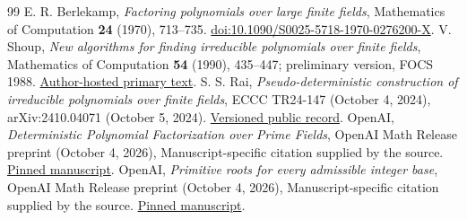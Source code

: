 \documentclass[11pt]{article}
\begin{document}
\begin{thebibliography}{99}
 E. R. Berlekamp, \emph{Factoring polynomials over large
finite fields}, Mathematics of Computation \textbf{24} (1970), 713--735.
\href{https://doi.org/10.1090/S0025-5718-1970-0276200-X}{doi:10.1090/S0025-5718-1970-0276200-X}.
 V. Shoup, \emph{New algorithms for finding irreducible
polynomials over finite fields}, Mathematics of Computation \textbf{54}
(1990), 435--447; preliminary version, FOCS 1988.
\href{https://www.shoup.net/papers/detirred.pdf}{Author-hosted primary text}.
 S. S. Rai, \emph{Pseudo-deterministic construction of irreducible
polynomials over finite fields}, ECCC TR24-147 (October 4, 2024), arXiv:2410.04071 (October 5, 2024).
\href{https://arxiv.org/abs/2410.04071}{Versioned public record}.
 OpenAI, \emph{Deterministic Polynomial Factorization over
Prime Fields}, OpenAI Math Release preprint (October 4, 2026),
Manuscript-specific citation supplied by the source.
\href{https://github.com/openai/math/blob/adc7f1241b42e322a6451854ab7e4b4c146bf78a/preprints/Deterministic-Polynomial-Factorization-over-Prime-Fields-October-4-2026/Deterministic-Polynomial-Factorization-over-Prime-Fields.pdf}{Pinned manuscript}.
 OpenAI, \emph{Primitive roots for every admissible integer
base}, OpenAI Math Release preprint (October 4, 2026),
Manuscript-specific citation supplied by the source.
\href{https://github.com/openai/math/blob/adc7f1241b42e322a6451854ab7e4b4c146bf78a/preprints/Primitive-roots-for-every-admissible-integer-base-October-4-2026/primitive-roots-all-integer-bases.pdf}{Pinned manuscript}.
\end{thebibliography}
\end{document}

